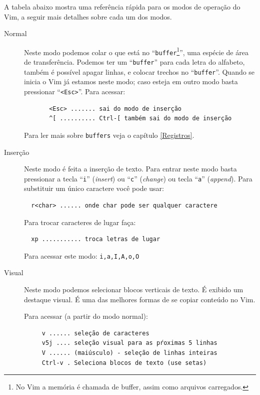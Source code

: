 \documentclass[10pt,a4paper,openany]{book}
\begin{document}
A tabela abaixo mostra uma referência rápida para os modos de operação do Vim,
a seguir mais detalhes sobre cada um dos modos.

\begin{description}

\item [Normal] Neste modo podemos colar o que está no
 ``\verb|buffer|\footnote{No Vim a memória é chamada de buffer, assim como
 arquivos carregados.}'', uma espécie de área de transferência. Podemos ter um
 ``\verb|buffer|'' para cada letra do alfabeto, também é possível apagar linhas, e
 colocar trechos no ``\verb|buffer|''. Quando se inicia o Vim já estamos neste modo;
 caso esteja em outro modo basta pressionar ``\verb|<Esc>|''.  Para acessar:

\begin{verbatim}
	   <Esc> ....... sai do modo de inserção
	   ^[ .......... Ctrl-[ também sai do modo de inserção
\end{verbatim}

Para ler mais sobre \verb|buffers| veja o capítulo \ref{Registros}.

\item [Inserção]
Neste modo é feita a inserção de texto. Para entrar neste modo basta
pressionar a tecla ``\verb|i|'' ({\em insert}) ou ``\verb|c|'' ({\em change})
ou tecla ``\verb|a|'' ({\em append}).  Para substituir um único caractere você
pode usar:

\begin{verbatim}
  r<char> ...... onde char pode ser qualquer caractere
\end{verbatim}

Para trocar caracteres de lugar faça:

\begin{verbatim}
  xp ........... troca letras de lugar
\end{verbatim}


Para acessar este modo:  \verb+i,a,I,A,o,O+

\item [Visual] Neste modo podemos selecionar blocos verticais de texto. É
exibido um destaque visual. É uma das melhores formas de se copiar
conteúdo no Vim.

Para acessar (a partir do modo normal):

\begin{verbatim}
	 v ...... seleção de caracteres
	 v5j .... seleção visual para as pŕoximas 5 linhas
	 V ...... (maiúsculo) - seleção de linhas inteiras
	 Ctrl-v . Seleciona blocos de texto (use setas)
\end{verbatim}


\end{description}
\end{document}
